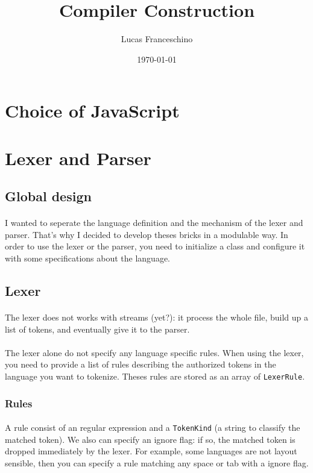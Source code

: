 \documentclass{article}
\title{Compiler Construction}
\date{\today}
\author{Lucas Franceschino}
\newcommand\cc[1]{\texttt{#1}}
\begin{document}
	\maketitle

	\tableofcontents
	\newpage

	\section{Choice of JavaScript}
	\section{Lexer and Parser}
		\subsection{Global design}
			\paragraph{} I wanted to seperate the language definition and the mechanism of the lexer and parser. That's why I decided to develop theses bricks in a modulable way. In order to use the lexer or the parser, you need to initialize a class and configure it with some specifications about the language.
		\subsection{Lexer}
			\paragraph{} The lexer does not works with streams (yet?): it process the whole file, build up a list of tokens, and eventually give it to the parser. 
			\paragraph{} The lexer alone do not specify any language specific rules. When using the lexer, you need to provide a list of rules describing the authorized tokens in the language you want to tokenize. Theses rules are stored as an array of \cc{LexerRule}.
			\subsubsection{Rules}
				\paragraph{} A rule consist of an regular expression and a \cc{TokenKind} (a string to classify the matched token). We also can specify an ignore flag: if so, the matched token is dropped immediately by the lexer. For example, some languages are not layout sensible, then you can specify a rule matching any space or tab with a ignore flag.
\end{document}
